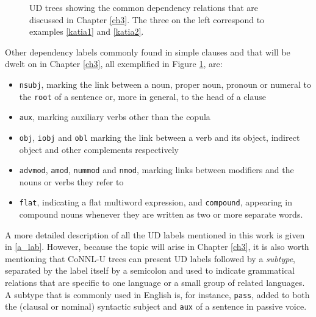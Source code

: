 \begin{figure}[H]
   \caption[UD trees showing the common dependency relations that are discussed in Chapter \ref{ch3}]{UD trees showing the common dependency relations that are discussed in Chapter \ref{ch3}. The three on the left correspond to examples \ref{katia1} and \ref{katia2}.}
    \label{katia}
\end{figure}

Other dependency labels commonly found in simple clauses and that will be dwelt on in Chapter \ref{ch3}, all exemplified in Figure \ref{katia}, are: \smallskip
\begin{itemize}
    \item \texttt{nsubj}, marking the link between a noun, proper noun, pronoun or numeral to the \texttt{root} of a sentence or, more in general, to the head of a clause
    \item \texttt{aux}, marking auxiliary verbs other than the copula
    \item \texttt{obj}, \texttt{iobj} and \texttt{obl} marking the link between a verb and its object, indirect object and other complements respectively
    \item \texttt{advmod}, \texttt{amod}, \texttt{nummod} and \texttt{nmod}, marking links between modifiers and the nouns or verbs they refer to
    \item \texttt{flat}, indicating a flat multiword expression, and \texttt{compound}, appearing in compound nouns whenever they are written as two or more separate words.
\end{itemize} \smallskip

A more detailed description of all the UD labels mentioned in this work is given in \ref{a_lab}. 
However, because the topic will arise in Chapter \ref{ch3}, it is also worth mentioning that CoNNL-U trees can present UD labels followed by a \textit{subtype}, separated by the label itself by a semicolon and used to indicate grammatical relations that are specific to one language or a small group of related languages. A subtype that is commonly used in English is, for instance, \texttt{pass}, added to both the (clausal or nominal) syntactic subject and \texttt{aux} of a sentence in passive voice.

